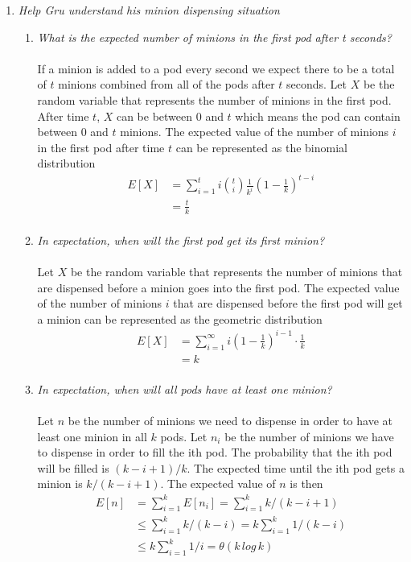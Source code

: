 \documentclass[12pt]{article}
\begin{document}
\begin{enumerate}
		\newpage
		\item \textit{Help Gru understand his minion dispensing situation}
		\begin{enumerate}
		    \item \textit{What is the expected number of minions in the first pod after t seconds?}\\
		    \\
		    If a minion is added to a pod every second we expect there to be a total of $t$ minions combined from all of the pods after $t$ seconds.   Let $X$ be the random variable that represents the number of minions in the first pod.  After time $t$, $X$ can be between 0 and $t$ which means the pod can contain between 0 and $t$ minions.  The expected value of the number of minions $i$ in the first pod after time $t$ can be represented as the binomial distribution \cite{2}
		    \begin{align*}
		    E[X] &= \sum_{i=1}^{t} i\binom{t}{i}\frac{1}{k^i}(1-\frac{1}{k})^{t-i}\\
		    &=\frac{t}{k}\\
		    \end{align*}
		    \item \textit{In expectation, when will the first pod get its first minion?}\\
		    \\
		    Let $X$ be the random variable that represents the number of minions that are dispensed before a minion goes into the first pod.  The expected value of the number of minions $i$ that are dispensed before the first pod will get a minion can be represented as the geometric distribution \cite{3}
		    \begin{align*}
		    E[X] &= \sum_{i=1}^{\infty} i(1-\frac{1}{k})^{i-1} \cdot \frac{1}{k}\\
		    &= k\\
		    \end{align*}
		    
		    \item \textit{In expectation, when will all pods have at least one minion?}\\
		    \\
		    Let $n$ be the number of minions we need to dispense in order to have at least one minion in all $k$ pods.  Let $n_i$ be the number of minions we have to dispense in order to fill the ith pod.  The probability that the ith pod will be filled is $(k-i+1)/k$.  The expected time until the ith pod gets a minion is $k/(k-i+1)$. The expected value of $n$ is then \cite{4}
		    \begin{align*}
		        E[n] &= \sum_{i=1}^{k} E[n_i]=\sum_{i=1}^{k} k/(k-i+1)\\
		        &\le \sum_{i=1}^{k} k/(k-i)=k\sum_{i=1}^{k} 1/(k-i)\\
		        &\le k\sum_{i=1}^{k} 1/i=\theta(k\,log\,k)\\
		    \end{align*}
		    
		\end{enumerate}

\end{enumerate}
\end{document}
